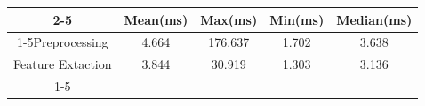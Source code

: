 \documentclass{standalone}
\begin{document}
 
 \begin{tabular}{|c |c |c |c |c |}
\cline{2-5}\cline{2-5} \multicolumn{1}{c |}{ } & Mean(ms) & Max(ms) & Min(ms) & Median(ms)\\ 
\cline{1-5}Preprocessing & 4.664 & 176.637 & 1.702 & 3.638\\ 
 \hhline{|=|=|=|=|=|}Feature Extaction & 3.844 & 30.919 & 1.303 & 3.136\\ 
 \cline{1-5}\hline \end{tabular}
 
\end{document}
